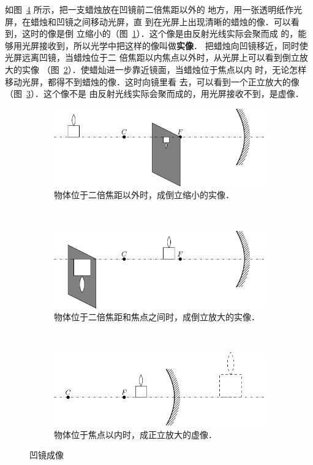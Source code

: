 如图~\ref{fig_C_5-16} 所示，把一支蜡烛放在凹镜前二倍焦距以外的
地方，用一张透明纸作光屏，在蜡烛和凹镜之间移动光屏，直
到在光屏上出现清晰的蜡烛的像．可以看到，这时的像是倒
立缩小的（图~\ref{fig_C_5-16a}）．这个像是由反射光线实际会聚而成
的，能够用光屏接收到，所以光学中把这样的像叫做\textbf{实像}．
把蜡烛向凹镜移近，同时使光屏远离凹镜，当蜡烛位于二
倍焦距以内焦点以外时，从光屏上可以看到倒立放大的实像
（图~\ref{fig_C_5-16b}）．使蜡灿进一步靠近镜面，当蜡烛位于焦点以内
时，无论怎样移动光屏，都得不到蜡烛的像．这时向镜里看
去，可以看到一个正立放大的像（图~\ref{fig_C_5-16c}）．这个像不是
由反射光线实际会聚而成的，用光屏接收不到，是虚像．
\begin{figure}[htbp]
	\centering
	\begin{subfigure}{0.9\linewidth}
		\centering
		\includegraphics{fig/C/5-16a.pdf}
		\caption{物体位于二倍焦距以外时，成倒立缩小的实像．}\label{fig_C_5-16a}
	\end{subfigure}
	\\
	\begin{subfigure}{0.9\linewidth}
		\centering
		\includegraphics{fig/C/5-16b.pdf}
		\caption{物体位于二倍焦距和焦点之间时，成倒立放大的实像．}\label{fig_C_5-16b}
	\end{subfigure}
	\\
	\begin{subfigure}{0.9\linewidth}
		\centering
		\includegraphics{fig/C/5-16c.pdf}
		\caption{物体位于焦点以内时，成正立放大的虚像．}\label{fig_C_5-16c}
	\end{subfigure}
	\caption{凹镜成像}\label{fig_C_5-16}
\end{figure}



